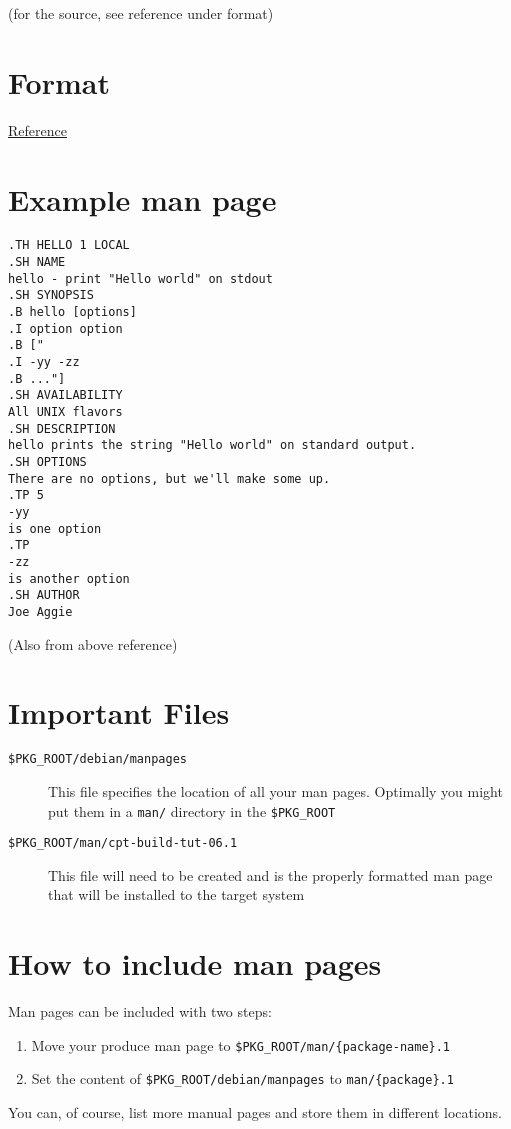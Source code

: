\documentclass[]{article}
\begin{document}
(for the source, see reference under format)

\section{Format}

\href{https://www.fnal.gov/docs/products/ups/ReferenceManual/html/manpages.html}{Reference}

\section{Example man page}

\begin{verbatim}
.TH HELLO 1 LOCAL
.SH NAME
hello - print "Hello world" on stdout
.SH SYNOPSIS
.B hello [options]
.I option option
.B ["
.I -yy -zz
.B ..."]
.SH AVAILABILITY
All UNIX flavors
.SH DESCRIPTION
hello prints the string "Hello world" on standard output.
.SH OPTIONS
There are no options, but we'll make some up.
.TP 5
-yy
is one option
.TP
-zz
is another option
.SH AUTHOR
Joe Aggie
\end{verbatim}
(Also from above reference)

\section{Important Files}

\begin{description}
\item[\texttt{\$PKG\_ROOT/debian/manpages}]
This file specifies the location of all your man pages. Optimally you
might put them in a \texttt{man/} directory in the \texttt{\$PKG\_ROOT}

\item[\texttt{\$PKG\_ROOT/man/cpt-build-tut-06.1}]
This file will need to be created and is the properly formatted man page
that will be installed to the target system

\end{description}
\section{How to include man pages}

Man pages can be included with two steps:

\begin{enumerate}[1.]
\item
  Move your produce man page to
  \texttt{\$PKG\_ROOT/man/\{package-name\}.1}
\item
  Set the content of \texttt{\$PKG\_ROOT/debian/manpages} to
  \texttt{man/\{package\}.1}
\end{enumerate}
You can, of course, list more manual pages and store them in different
locations.
\end{document}
